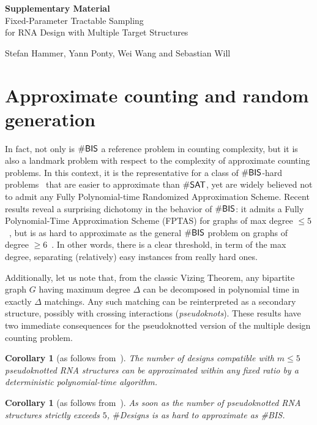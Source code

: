 \documentclass[10pt]{article}
\newtheorem{corollary}[theorem]{Corollary}
\newcommand{\Def}[1]{\emph{#1}}
\newcommand{\NumDesign}{\ensuremath{\#}{\sf Designs}\xspace}
\newcommand{\citep}[1]{\cite{#1}}
\begin{document}
\onecolumn

\appendix
{\centering \Large \textbf{Supplementary Material}\\[1em] Fixed-Parameter Tractable Sampling\\ for RNA Design with Multiple Target Structures\\%
}

\medskip
\begin{center}
\large Stefan Hammer, Yann Ponty, Wei Wang and Sebastian Will
\end{center}
\section{Approximate counting and random generation}
In fact, not only is $\#{\sf BIS}$ a reference problem in counting complexity, but it is also a landmark problem with respect to the complexity of approximate counting problems. In this context, it is the representative for a class of $\#{\sf BIS}$-hard problems~\citep{Bulatov2013} that are easier to approximate than $\# {\sf SAT}$, yet are widely believed not to admit any Fully Polynomial-time Randomized Approximation Scheme. Recent results reveal a surprising dichotomy in the behavior of $\#{\sf BIS}$: it admits a Fully Polynomial-Time Approximation Scheme (FPTAS) for graphs of max degree $\le 5$~\citep{Weitz2006}, but is as hard to approximate as the general $\#{\sf BIS}$ problem on graphs of degree $\ge 6$~\citep{Cai2016}. In other words, there is a clear threshold, in term of the max degree, separating (relatively) easy instances from really hard ones.

Additionally, let us note that, from the classic Vizing Theorem, any bipartite graph $G$ having maximum degree $\Delta$ can be decomposed in polynomial time in exactly $\Delta$ matchings. Any such matching can be reinterpreted as a secondary structure, possibly with crossing interactions (\Def{pseudoknots}). These results have two immediate consequences for the pseudoknotted version of the multiple design counting problem.
\begin{corollary}[as follows from~\citep{Weitz2006}]The number of designs compatible with $m\le 5$ pseudoknotted RNA structures can be approximated within any fixed ratio by a deterministic polynomial-time algorithm.
\end{corollary}
\begin{corollary}[as follows from~\citep{Cai2016}]
  As soon as the number of pseudoknotted RNA structures strictly exceeds $5$, \NumDesign is as hard to approximate as {\#{\sf BIS}}.
\end{corollary}
\end{document}
